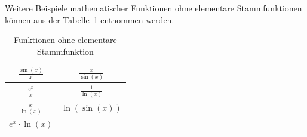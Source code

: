 \noindent
Weitere Beispiele mathematischer Funktionen ohne elementare Stammfunktionen können aus 
der Tabelle~\ref{buch:table:funktionenohnestammfunktion} entnommen werden.

\begin{table}[h!]
    \centering
    \begin{tabular}{|c|c|}
        \hline
        $\displaystyle \frac{\sin(x)}{x}$ & $\displaystyle \frac{x}{\sin(x)}$ \\
        \hline
        $\displaystyle \frac{e^{x}}{x}$ & $\displaystyle \frac{1}{\operatorname{ln}(x)}$ \\
        \hline
        $\displaystyle \frac{x}{\operatorname{ln}(x)}$ & $\displaystyle \operatorname{ln}(\sin(x))$ \\
        \hline
        $\displaystyle e^{x}\cdot\operatorname{ln}(x)$ &  \\
        \hline
    \end{tabular}
    
    \caption{Funktionen ohne elementare Stammfunktion
    \label{buch:table:funktionenohnestammfunktion}}  
    
\end{table}